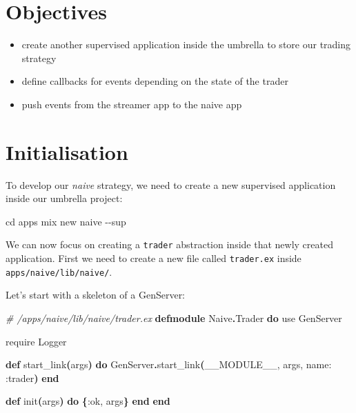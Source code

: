 \documentclass[
  oneside]{book}
\newenvironment{Shaded}{\begin{snugshade}}{\end{snugshade}}
\newcommand{\AttributeTok}[1]{\textcolor[rgb]{0.13,0.29,0.53}{#1}}
\newcommand{\BuiltInTok}[1]{#1}
\newcommand{\CommentTok}[1]{\textcolor[rgb]{0.56,0.35,0.01}{\textit{#1}}}
\newcommand{\ConstantTok}[1]{\textcolor[rgb]{0.56,0.35,0.01}{#1}}
\newcommand{\ExtensionTok}[1]{#1}
\newcommand{\FunctionTok}[1]{\textcolor[rgb]{0.13,0.29,0.53}{\textbf{#1}}}
\newcommand{\ImportTok}[1]{#1}
\newcommand{\KeywordTok}[1]{\textcolor[rgb]{0.13,0.29,0.53}{\textbf{#1}}}
\newcommand{\NormalTok}[1]{#1}
\newcommand{\OperatorTok}[1]{\textcolor[rgb]{0.81,0.36,0.00}{\textbf{#1}}}
\newcommand{\VariableTok}[1]{\textcolor[rgb]{0.00,0.00,0.00}{#1}}
\providecommand{\tightlist}{%
  \setlength{\itemsep}{0pt}\setlength{\parskip}{0pt}}
\begin{document}
\section{Objectives}\label{objectives-1}

\begin{itemize}
\tightlist
\item
  create another supervised application inside the umbrella to store our trading strategy
\item
  define callbacks for events depending on the state of the trader
\item
  push events from the streamer app to the naive app
\end{itemize}

\section{Initialisation}\label{initialisation}

To develop our \emph{naive} strategy, we need to create a new supervised application inside our umbrella project:

\begin{Shaded}
\begin{Highlighting}[]
\BuiltInTok{cd}\NormalTok{ apps}
\ExtensionTok{mix}\NormalTok{ new naive }\AttributeTok{{-}{-}sup}
\end{Highlighting}
\end{Shaded}

We can now focus on creating a \texttt{trader} abstraction inside that newly created application. First we need to create a new file called \texttt{trader.ex} inside \texttt{apps/naive/lib/naive/}.

Let's start with a skeleton of a GenServer:

\begin{Shaded}
\begin{Highlighting}[]
\CommentTok{\# /apps/naive/lib/naive/trader.ex}
\KeywordTok{defmodule} \ConstantTok{Naive}\OperatorTok{.}\ConstantTok{Trader} \KeywordTok{do}
  \ImportTok{use} \ConstantTok{GenServer}

  \ImportTok{require} \ConstantTok{Logger}

  \KeywordTok{def}\NormalTok{ start\_link}\FunctionTok{(}\NormalTok{args}\FunctionTok{)} \KeywordTok{do}
    \ConstantTok{GenServer}\OperatorTok{.}\NormalTok{start\_link}\FunctionTok{(}\ConstantTok{\_\_MODULE\_\_}\NormalTok{, args, }\VariableTok{name:} \VariableTok{:trader}\FunctionTok{)}
  \KeywordTok{end}

  \KeywordTok{def}\NormalTok{ init}\FunctionTok{(}\NormalTok{args}\FunctionTok{)} \KeywordTok{do}
    \FunctionTok{\{}\VariableTok{:ok}\NormalTok{, args}\FunctionTok{\}}
  \KeywordTok{end}
\KeywordTok{end}
\end{Highlighting}
\end{Shaded}
\end{document}
